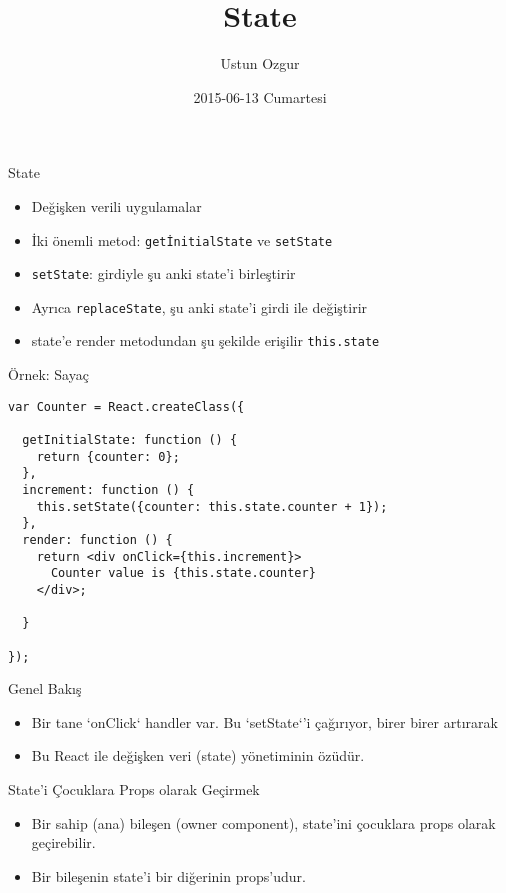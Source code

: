 \documentclass[presentation]{beamer}
\author{Ustun Ozgur}
\date{2015-06-13 Cumartesi}
\title{State}
\begin{document}
\maketitle

\begin{frame}[fragile,label=sec-1]{State}
 \begin{itemize}
\item Değişken verili uygulamalar
\item İki önemli metod: \texttt{getİnitialState} ve \texttt{setState}
\item \texttt{setState}: girdiyle şu anki state'i birleştirir
\item Ayrıca \texttt{replaceState}, şu anki state'i girdi ile değiştirir
\item state'e render metodundan şu şekilde erişilir \texttt{this.state}
\end{itemize}
\end{frame}

\begin{frame}[fragile,label=sec-2]{Örnek: Sayaç}
 \begin{verbatim}
var Counter = React.createClass({

  getInitialState: function () {
    return {counter: 0};
  },
  increment: function () {
    this.setState({counter: this.state.counter + 1});
  },
  render: function () {
    return <div onClick={this.increment}>
      Counter value is {this.state.counter}
    </div>;

  }

});
\end{verbatim}
\end{frame}

\begin{frame}[label=sec-3]{Genel Bakış}
\begin{itemize}
\item Bir tane `onClick` handler var. Bu `setState`'i çağırıyor, birer birer artırarak
\item Bu React ile değişken veri (state) yönetiminin özüdür.
\end{itemize}
\end{frame}

\begin{frame}[label=sec-4]{State'i Çocuklara Props olarak Geçirmek}
\begin{itemize}
\item Bir sahip (ana) bileşen (owner component), state'ini çocuklara props olarak geçirebilir.
\item Bir bileşenin state'i bir diğerinin props'udur.
\end{itemize}
\end{frame}
\end{document}
